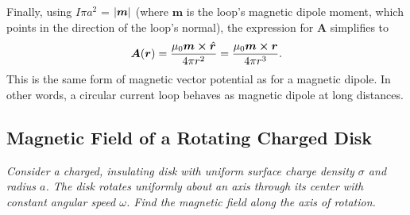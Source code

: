 \documentclass[11pt, a4paper]{article}
\renewcommand{\vec}[1]{\bm{#1}} %
\newcommand{\uvec}[1]{\hat{\vec{#1}}} %
\renewcommand{\r}{\vec{r}}
\newcommand{\A}{\vec{A}}  %
\newcommand{\m}{\vec{m}}  %
\begin{document}
\begin{itemize}
	
	Finally, using $ I \pi a^{2} $ = $ \abs{\vec{m}} $ (where $ \m $ is the loop's magnetic dipole moment, which points in the direction of the loop's normal), the expression for $ \A $ simplifies to
	\begin{equation*}
		\A(\r) = \frac{\mu_{0} \m \cross \uvec{r}}{4\pi r^{2}} = \frac{\mu_{0} \m \cross \r}{4\pi r^{3}}.
	\end{equation*}
	This is the same form of magnetic vector potential as for a magnetic dipole. In other words, a circular current loop behaves as magnetic dipole at long distances.
	
\end{itemize}

\subsection{Magnetic Field of a Rotating Charged Disk}
\textit{Consider a charged, insulating disk with uniform surface charge density $ \sigma $ and radius $ a $. The disk rotates uniformly about an axis through its center with constant angular speed $ \omega $. Find the magnetic field along the axis of rotation.}
\end{document}

